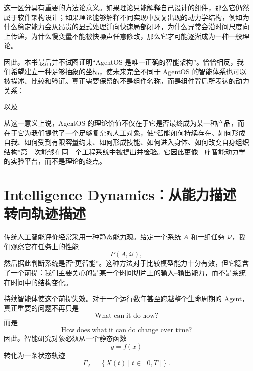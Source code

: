 这一区分具有重要的方法论意义。如果理论只能解释自己设计的组件，那么它仍然属于软件架构设计；如果理论能够解释不同实现中反复出现的动力学结构，例如为什么稳定能力会从昂贵的显式处理迁向快速局部闭环，为什么异常会沿时间尺度向上传递，为什么慢变量不能被快噪声任意修改，那么它才可能逐渐成为一种一般理论。

因此，本书最后并不试图证明“AgentOS 是唯一正确的智能架构”。恰恰相反，我们希望建立一种足够抽象的坐标，使未来完全不同于 AgentOS 的智能体系也可以被描述、比较和验证。真正需要保留的不是组件名称，而是组件背后所表达的动力关系：
\begin{statementbox}
\centering
{}
\end{statementbox}
\begin{statementbox}
\centering
{}
\end{statementbox}
\begin{statementbox}
\centering
{}
\end{statementbox}
以及
\begin{statementbox}
\centering
{}
\end{statementbox}

从这一意义上说，AgentOS 的理论价值不仅在于它是否最终成为某一种产品，而在于它为我们提供了一个足够复杂的人工对象，使“智能如何持续存在、如何形成自我、如何受到有限容量约束、如何形成技能、如何进入身体、如何改变自身组织结构”第一次能够在同一个工程系统中被提出并检验。它因此更像一座智能动力学的实验平台，而不是理论的终点。

\section{Intelligence Dynamics：从能力描述转向轨迹描述}

传统人工智能评价经常采用一种静态能力观。给定一个系统 $A$ 和一组任务 $\mathcal{Q}$，我们观察它在任务上的性能
\begin{equation}
P(A,\mathcal{Q}),
\end{equation}
然后据此判断系统是否“更智能”。这种方法对于比较模型能力十分有效，但它隐含了一个前提：我们主要关心的是某一个时间切片上的输入--输出能力，而不是系统在时间中的结构变化。

持续智能体使这个前提失效。对于一个运行数年甚至跨越整个生命周期的 Agent，真正重要的问题不再只是
\begin{equation}
\text{What can it do now?}
\end{equation}
而是
\begin{equation}
\text{How does what it can do change over time?}
\end{equation}
因此，智能研究对象必须从一个静态函数
\begin{equation}
y=f(x)
\end{equation}
转化为一条状态轨迹
\begin{equation}
\Gamma_{A}
=
\left\{
X(t)
\mid
t\in[0,T]
\right\}.
\end{equation}

